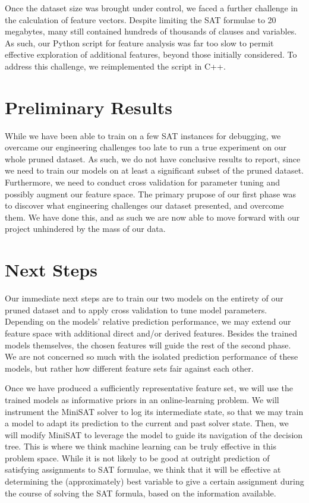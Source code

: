 \documentclass{article}
\begin{document}
Once the dataset size was brought under control, we faced a further challenge in
the calculation of feature vectors. Despite limiting the SAT formulae to 20
megabytes, many still contained hundreds of thousands of clauses and variables.
As such, our Python script for feature analysis was far too slow to permit
effective exploration of additional features, beyond those initially considered.
To address this challenge, we reimplemented the script in C++.

\section*{Preliminary Results}
While we have been able to train on a few SAT instances for debugging, we
overcame our engineering challenges too late to run a true experiment on our
whole pruned dataset. As such, we do not have conclusive results to report,
since we need to train our models on at least a significant subset of the pruned
dataset. Furthermore, we need to conduct cross validation for parameter tuning
and possibly augment our feature space. The primary prupose of our first phase
was to discover what engineering challenges our dataset presented, and overcome
them. We have done this, and as such we are now able to move forward with our
project unhindered by the mass of our data.

\section*{Next Steps}
Our immediate next steps are to train our two models on the entirety of our
pruned dataset and to apply cross validation to tune model parameters. Depending
on the models' relative prediction performance, we may extend our feature space
with additional direct and/or derived features. Besides the trained models
themselves, the chosen features will guide the rest of the second phase. We are
not concerned so much with the isolated prediction performance of these models,
but rather how different feature sets fair against each other.

Once we have produced a sufficiently representative feature set, we will use the
trained models as informative priors in an online-learning problem. We will
instrument the MiniSAT solver to log its intermediate state, so that we may
train a model to adapt its prediction to the current and past solver state.
Then, we will modify MiniSAT to leverage the model to guide its navigation of
the decision tree. This is where we think machine learning can be truly
effective in this problem space. While it is not likely to be good at outright
prediction of satisfying assignments to SAT formulae, we think that it will be
effective at determining the (approximately) best variable to give a certain
assignment during the course of solving the SAT formula, based on the
information available.
\end{document}

